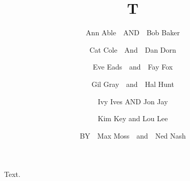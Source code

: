 \documentclass{article}
\title{T}
\author{Ann Able~~AND~~Bob Baker
\and Cat Cole~~And~~Dan Dorn
\and Eve Eads~~{and}~~Fay Fox
\and Gil Gray~~\textrm{and}~~Hal Hunt
\and Ivy Ives \;\;\textnormal{AND}\;\; Jon Jay
\and Kim Key \quad \textnormal{and} \quad Lou Lee
\and BY~~Max Moss~~and~~Ned Nash}
\begin{document}
\maketitle
Text.
\end{document}

